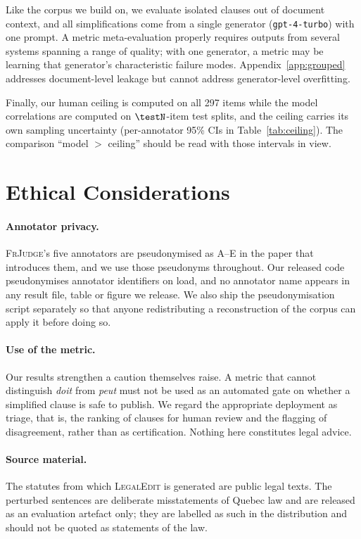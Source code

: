 \documentclass[11pt]{article}
\begin{document}
Like the corpus we build on, we evaluate isolated clauses out of document
context, and all simplifications come from a single generator
(\texttt{gpt-4-turbo}) with one prompt. A metric meta-evaluation properly
requires outputs from several systems spanning a range of quality; with one
generator, a metric may be learning that generator's characteristic failure
modes. Appendix~\ref{app:grouped} addresses document-level leakage but cannot
address generator-level overfitting.

Finally, our human ceiling is computed on all 297 items while the model
correlations are computed on $\testN$-item test splits, and the ceiling carries
its own sampling uncertainty (per-annotator 95\% CIs in
Table~\ref{tab:ceiling}). The comparison ``model $>$ ceiling'' should be read
with those intervals in view.

\section*{Ethical Considerations}
\label{sec:ethics}

\paragraph{Annotator privacy.}
\textsc{FrJudge}'s five annotators are pseudonymised as A--E in the paper that
introduces them, and we use those pseudonyms throughout. Our released code
pseudonymises annotator identifiers on load, and no annotator name appears in
any result file, table or figure we release. We also ship the pseudonymisation
script separately so that anyone redistributing a reconstruction of the corpus
can apply it before doing so.

\paragraph{Use of the metric.}
Our results strengthen a caution \citet{beauchemin2025judgebert} themselves
raise. A metric that cannot distinguish \emph{doit} from \emph{peut} must not be
used as an automated gate on whether a simplified clause is safe to publish. We
regard the appropriate deployment as triage, that is, the ranking of clauses for
human review and the flagging of disagreement, rather than as certification.
Nothing here constitutes legal advice.

\paragraph{Source material.}
The statutes from which \textsc{LegalEdit} is generated are public legal texts.
The perturbed sentences are deliberate misstatements of Quebec law and are
released as an evaluation artefact only; they are labelled as such in the
distribution and should not be quoted as statements of the law.
\end{document}
